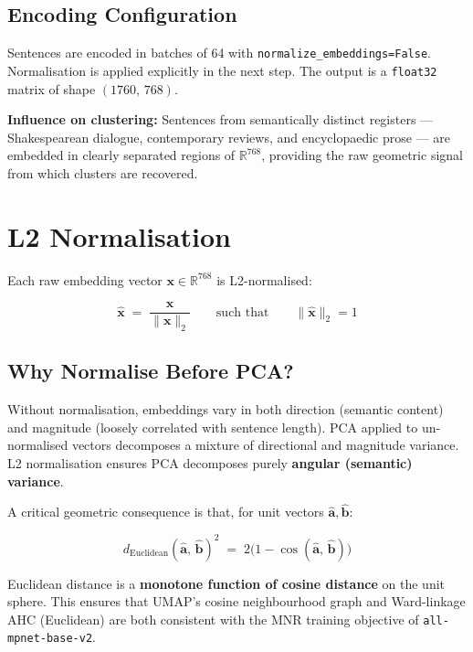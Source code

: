 \documentclass[11pt, a4paper]{article}
\begin{document}
\subsection{Encoding Configuration}

Sentences are encoded in batches of 64 with
\texttt{normalize\_embeddings=False}.  Normalisation is applied explicitly in
the next step.  The output is a \texttt{float32} matrix of shape
$(1760,\,768)$.

\begin{insightbox}
\textbf{Influence on clustering:} Sentences from semantically distinct
registers --- Shakespearean dialogue, contemporary reviews, and encyclopaedic
prose --- are embedded in clearly separated regions of $\mathbb{R}^{768}$,
providing the raw geometric signal from which clusters are recovered.
\end{insightbox}

\section{L2 Normalisation}

Each raw embedding vector $\mathbf{x} \in \mathbb{R}^{768}$ is L2-normalised:

\begin{mathbox}
\[
  \hat{\mathbf{x}} \;=\; \frac{\mathbf{x}}{\|\mathbf{x}\|_2}
  \qquad \text{such that} \qquad
  \|\hat{\mathbf{x}}\|_2 = 1
\]
\end{mathbox}

\subsection{Why Normalise Before PCA?}

Without normalisation, embeddings vary in both direction (semantic content) and
magnitude (loosely correlated with sentence length).  PCA applied to
un-normalised vectors decomposes a mixture of directional and magnitude
variance.  L2 normalisation ensures PCA decomposes purely
\textbf{angular (semantic) variance}.

A critical geometric consequence is that, for unit vectors
$\hat{\mathbf{a}}, \hat{\mathbf{b}}$:

\begin{mathbox}
\[
  d_{\mathrm{Euclidean}}(\hat{\mathbf{a}},\,\hat{\mathbf{b}})^{2}
  \;=\;
  2\bigl(1 - \cos(\hat{\mathbf{a}},\, \hat{\mathbf{b}})\bigr)
\]
\end{mathbox}

Euclidean distance is a \textbf{monotone function of cosine distance} on the
unit sphere.  This ensures that UMAP's cosine neighbourhood graph and
Ward-linkage AHC (Euclidean) are both consistent with the MNR training
objective of \texttt{all-mpnet-base-v2}.
\end{document}

